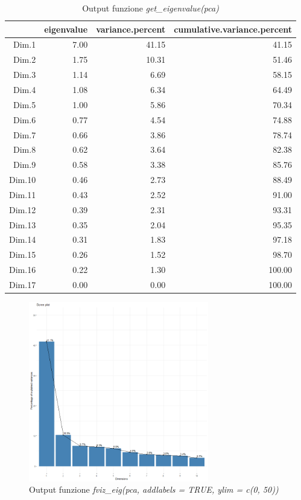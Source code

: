 \documentclass[letterpaper,11pt]{article}
\begin{document}
\begin{table}[H]
\centering
\begin{tabular}{rrrr}
  \hline
 & eigenvalue & variance.percent & cumulative.variance.percent \\ 
  \hline
Dim.1 & 7.00 & 41.15 & 41.15 \\ 
  Dim.2 & 1.75 & 10.31 & 51.46 \\ 
  Dim.3 & 1.14 & 6.69 & 58.15 \\ 
  Dim.4 & 1.08 & 6.34 & 64.49 \\ 
  Dim.5 & 1.00 & 5.86 & 70.34 \\ 
  Dim.6 & 0.77 & 4.54 & 74.88 \\ 
  Dim.7 & 0.66 & 3.86 & 78.74 \\ 
  Dim.8 & 0.62 & 3.64 & 82.38 \\ 
  Dim.9 & 0.58 & 3.38 & 85.76 \\ 
  Dim.10 & 0.46 & 2.73 & 88.49 \\ 
  Dim.11 & 0.43 & 2.52 & 91.00 \\ 
  Dim.12 & 0.39 & 2.31 & 93.31 \\ 
  Dim.13 & 0.35 & 2.04 & 95.35 \\ 
  Dim.14 & 0.31 & 1.83 & 97.18 \\ 
  Dim.15 & 0.26 & 1.52 & 98.70 \\ 
  Dim.16 & 0.22 & 1.30 & 100.00 \\ 
  Dim.17 & 0.00 & 0.00 & 100.00 \\ 
   \hline
\end{tabular}
\caption{Output funzione \textit{get\_eigenvalue(pca)}}
\label{fig:get_eigenvalue(pca)}
\end{table}
\begin{figure}[H]
    \centering
    \includegraphics[width=0.7\textwidth]{Img/PCA/PCA001.png}
    \caption{Output funzione \textit{fviz\_eig(pca, addlabels = TRUE, ylim = c(0, 50))}}
    \label{fig:fviz_eig(pca, addlabels = TRUE, ylim = c(0, 50))}
\end{figure}
\end{document}
